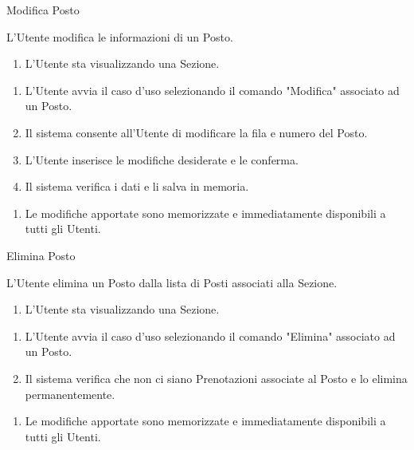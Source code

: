{\ucTable	%
{	%
	Modifica Posto
	
}{	%
	
}{	%
	L'Utente modifica le informazioni di un Posto.
	
}{	%
	\attori
	
}{	%
	\begin{enumerate}
        \item L'Utente sta visualizzando una Sezione.
    \end{enumerate}
	
}{	%
	\begin{enumerate}
        \item L'Utente avvia il caso d'uso selezionando il comando "Modifica" associato ad un Posto.
        \item Il sistema consente all'Utente di modificare la fila e numero del Posto.
        \item L'Utente inserisce le modifiche desiderate e le conferma.
        \item Il sistema verifica i dati e li salva in memoria.
    \end{enumerate}
	
}{	%
	\begin{enumerate}
        \item Le modifiche apportate sono memorizzate e immediatamente disponibili a tutti gli Utenti.
    \end{enumerate}
	
}{	%
} }

{\ucTable	%
{	%
	Elimina Posto
	
}{	%
	
}{	%
	L'Utente elimina un Posto dalla lista di Posti associati alla Sezione.
	
}{	%
	\attori
	
}{	%
	\begin{enumerate}
        \item L'Utente sta visualizzando una Sezione.
    \end{enumerate}
	
}{	%
	\begin{enumerate}
        \item L'Utente avvia il caso d'uso selezionando il comando "Elimina" associato ad un Posto.
        \item Il sistema verifica che non ci siano Prenotazioni associate al Posto e lo elimina permanentemente.
    \end{enumerate}
	
}{	%
	\begin{enumerate}
        \item Le modifiche apportate sono memorizzate e immediatamente disponibili a tutti gli Utenti.
    \end{enumerate}
	
}{	%
} }


